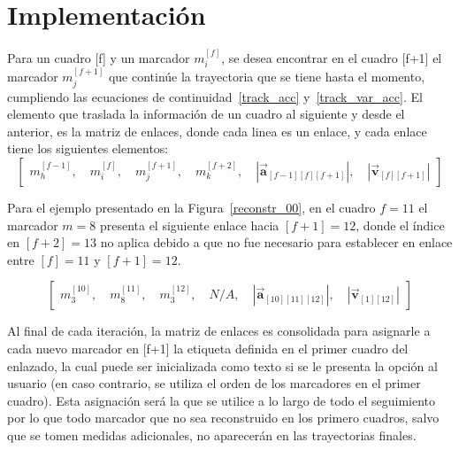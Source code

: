 \section{Implementación}

Para un cuadro [f] y un marcador $m_{i}^{[f]}$, se desea encontrar en el cuadro [f+1] el marcador $m_{j}^{[f+1]}$ que continúe la trayectoria que se tiene hasta el momento, cumpliendo las ecuaciones de continuidad~\ref{track_acc} y~\ref{track_var_acc}. El elemento que traslada la información de un cuadro al siguiente y desde el anterior, es la matriz de enlaces, donde cada linea es un enlace, y cada enlace tiene los siguientes elementos:
\begin{equation}
\begin{bmatrix}
  m_{h}^{[f-1]}, \quad m_{i}^{[f]}, \quad m_{j}^{[f+1]}, \quad m_{k}^{[f+2]}, \quad \left|\boldsymbol{\overrightarrow{a}}_{[f-1][f][f+1]}\right|, \quad \left|\boldsymbol{\overrightarrow{v}}_{[f][f+1]}\right|
\end{bmatrix}
\end{equation}

Para el ejemplo presentado en la Figura~\ref{reconstr_00}, en el cuadro $f=11$ el marcador $m=8$ presenta el siguiente enlace hacia $[f+1]=12$, donde el índice en $[f+2]=13$ no aplica debido a que no fue necesario para establecer en enlace entre $[f]=11$ y $[f+1]=12$.

\begin{equation}
\begin{bmatrix}
  m_{3}^{[10]}, \quad m_{8}^{[11]}, \quad m_{3}^{[12]}, \quad N/A, \quad \left|\boldsymbol{\overrightarrow{a}}_{[10][11][12]}\right|, \quad \left|\boldsymbol{\overrightarrow{v}}_{[1][12]}\right|
\end{bmatrix}
\end{equation}

Al final de cada iteración, la matriz de enlaces es consolidada para asignarle a cada nuevo marcador en [f+1] la etiqueta definida en el primer cuadro del enlazado, la cual puede ser inicializada como texto si se le presenta la opción al usuario (en caso contrario, se utiliza el orden de los marcadores en el primer cuadro). Esta asignación será la que se utilice a lo largo de todo el seguimiento por lo que todo marcador que no sea reconstruido en los primero cuadros, salvo que se tomen medidas adicionales, no aparecerán en las trayectorias finales.
\\

